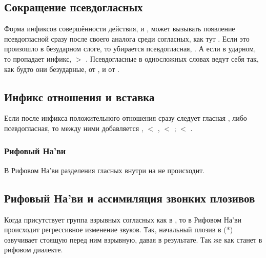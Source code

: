 \subsection{Сокращение псевдо\-гласных} 
 Форма инфиксов совершённости действия, 
и , может вызывать появление псевдогласной сразу после своего аналога среди согласных, как тут .  Если это произошло в безударном слоге, то убирается псевдогласная, .  А если в ударном, то пропадает инфикс,  $>$
.  Псевдогласные в односложных словах ведут себя так, как будто они безударные,  от , и 
от .

\subsection{Инфикс отношения и вставка} Если после инфикса положительного отношения  сразу следует гласная ,  либо псевдогласная, то между ними добавляется
,  $<$ ,  $<$
;  $<$ .
\label{l-and-s:eiy-epenth}

\subsubsection{Рифовый На'ви} 
В Рифовом На'ви разделения гласных внутри  на  не происходит.


\subsection{Рифовый На'ви и ассимиляция звонких плозивов} 
Когда присутствует группа взрывных согласных как в  , то в Рифовом На'ви происходит регрессивное изменение звуков.
Так, начальный плозив в (*) озвучивает стоящую перед ним взрывную, давая  в результате.
Так же как   станет  в рифовом диалекте.

